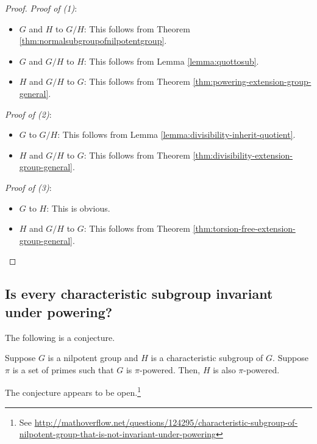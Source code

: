 \begin{proof}
  {\em Proof of (1)}:

  \begin{itemize}
  \item $G$ and $H$ to $G/H$: This follows from Theorem
    \ref{thm:normalsubgroupofnilpotentgroup}.
  \item $G$ and $G/H$ to $H$: This follows from Lemma \ref{lemma:quottosub}.
  \item $H$ and $G/H$ to $G$: This follows from Theorem
    \ref{thm:powering-extension-group-general}.
  \end{itemize}

  {\em Proof of (2)}:

  \begin{itemize}
  \item $G$ to $G/H$: This follows from Lemma \ref{lemma:divisibility-inherit-quotient}.
  \item $H$ and $G/H$ to $G$: This follows from Theorem \ref{thm:divisibility-extension-group-general}.
  \end{itemize}

  {\em Proof of (3)}:

  \begin{itemize}
  \item $G$ to $H$: This is obvious.
  \item $H$ and $G/H$ to $G$: This follows from Theorem \ref{thm:torsion-free-extension-group-general}.
  \end{itemize}
\end{proof}

\subsection{Is every characteristic subgroup invariant under powering?}\label{sec:charpowering}

The following is a conjecture.

\begin{conjecture}\label{conj:charpowering}
  Suppose $G$ is a nilpotent group and $H$ is a characteristic
  subgroup of $G$. Suppose $\pi$ is a set of primes such that $G$ is
  $\pi$-powered. Then, $H$ is also $\pi$-powered.
\end{conjecture}

The conjecture appears to be open.\footnote{See \url{http://mathoverflow.net/questions/124295/characteristic-subgroup-of-nilpotent-group-that-is-not-invariant-under-powering}}

